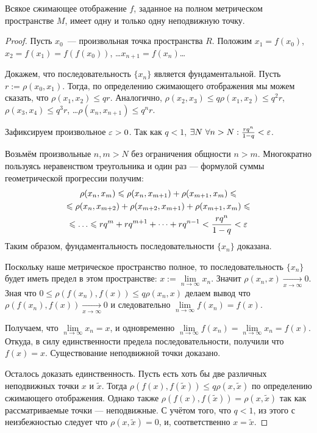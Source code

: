 \begin{Theorem}
	Всякое сжимающее отображение $f$, заданное на полном метрическом пространстве $M$, имеет одну и только одну неподвижную точку.
\end{Theorem}
\begin{proof}

Пусть  $x_0$ --- произвольная точка пространства $R$. Положим $x_1 = f(x_0) $, $x_2 = f(x_1) = f(f(x_0))$, \dots $x_{n+1} = f(x_{n})$\dots

Докажем, что последовательность  $\{ x_n \} $ является фундаментальной.
Пусть $r := \rho(x_0, x_1)$.  Тогда, по определению сжимающего отображения мы можем сказать, что  $\rho(x_1, x_2) \leq qr$. Аналогично, $\rho(x_2, x_3) \leq q \rho(x_1, x_2) \leq q^2r $, $\rho(x_3, x_4) \leq q^3r $, \dots  $\rho(x_{n}, x_{n+1}) \leq q^nr$.

Зафиксируем произвольное $\varepsilon>0$. 
Так как  $q < 1 $, $\exists N\ \forall n>N: \frac{rq^n}{1-q} < \varepsilon$.

Возьмём произвольные $n, m >N$ без ограничения общности $n>m$.
Многократно пользуясь неравенством треугольника и один раз --- формулой суммы геометрической прогрессии получим:
\begin{multline}\rho(x_n, x_m) \leq \rho(x_n, x_{m+1})+\rho(x_{m+1}, x_m)\leq\\ \leq \rho(x_n, x_{m+2})+ \rho(x_{m+2}, x_{m+1})+\rho(x_{m+1}, x_m) \leq\\\leq \dots\leq rq^{m} + rq^{m+1}+\dots+rq^{n-1} < \frac{rq^n}{1-q} < \eps \end{multline}	
Таким образом, фундаментальность последовательности  $\{ x_n \} $ доказана. 


Поскольку наше метрическое пространство полное, то последовательность $\{ x_n \}$ будет иметь предел в этом пространстве: $x:= \lim\limits_{n \to \infty}x_n$.
Значит $\rho(x_{n}, x) \xrightarrow[x \to\infty]{} 0$. Зная что $0\leq\rho(f(x_{n}), f(x))\leq q \rho(x_{n}, x)$ делаем вывод что $\rho(f(x_{n}), f(x)) \xrightarrow[x \to\infty]{} 0$ и следовательно $\lim\limits_{n \to \infty}f(x_n) = f(x)$.

Получаем, что  $\lim\limits_{n \to \infty}x_n = x$, и одновременно $\lim\limits_{n \to \infty}f(x_n) = \lim\limits_{n \to \infty}x_n= f(x)$. Откуда, в силу единственности предела последовательности, получили что $f(x) = x$.
Существование неподвижной точки доказано.


Осталось доказать единственность. 
Пусть есть хоть бы две различных неподвижных точки $x$ и $\tilde{x}$.
Тогда $\rho(f(x), f(\tilde{x})) \leq q\rho(x, \tilde{x})$ по определению сжимающего отображения. Однако также $\rho(f(x), f(\tilde{x})) = \rho(x, \tilde{x})$ так как рассматриваемые точки --- неподвижные. С учётом того, что $q<1$, из этого с неизбежностью следует что $\rho(x, \tilde{x}) = 0$, и, соответственно $x = \tilde{x}$.

\end{proof}

